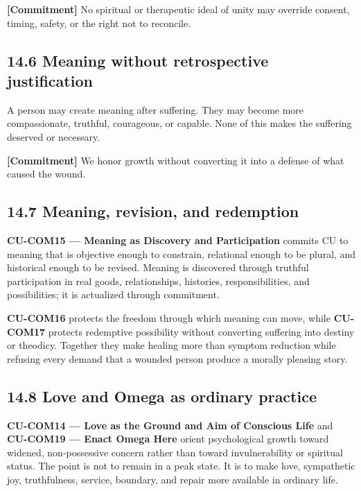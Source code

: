 \documentclass[
  11pt,
]{article}
\begin{document}
\textbf{{[}Commitment{]}} No spiritual or therapeutic ideal of unity may
override consent, timing, safety, or the right not to reconcile.

\subsection{14.6 Meaning without retrospective
justification}\label{meaning-without-retrospective-justification}

A person may create meaning after suffering. They may become more
compassionate, truthful, courageous, or capable. None of this makes the
suffering deserved or necessary.

\textbf{{[}Commitment{]}} We honor growth without converting it into a
defense of what caused the wound.

\subsection{14.7 Meaning, revision, and
redemption}\label{meaning-revision-and-redemption}

\textbf{CU-COM15 --- Meaning as Discovery and Participation} commits CU
to meaning that is objective enough to constrain, relational enough to
be plural, and historical enough to be revised. Meaning is discovered
through truthful participation in real goods, relationships, histories,
responsibilities, and possibilities; it is actualized through
commitment.

\textbf{CU-COM16} protects the freedom through which meaning can move,
while \textbf{CU-COM17} protects redemptive possibility without
converting suffering into destiny or theodicy. Together they make
healing more than symptom reduction while refusing every demand that a
wounded person produce a morally pleasing story.

\subsection{14.8 Love and Omega as ordinary
practice}\label{love-and-omega-as-ordinary-practice}

\textbf{CU-COM14 --- Love as the Ground and Aim of Conscious Life} and
\textbf{CU-COM19 --- Enact Omega Here} orient psychological growth
toward widened, non-possessive concern rather than toward
invulnerability or spiritual status. The point is not to remain in a
peak state. It is to make love, sympathetic joy, truthfulness, service,
boundary, and repair more available in ordinary life.
\end{document}
